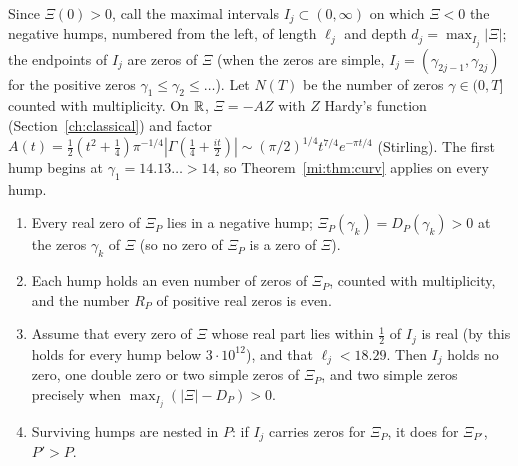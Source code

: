 Since $\Xi(0)>0$, call the maximal intervals $I_j\subset(0,\infty)$ on which $\Xi<0$ the negative humps, numbered from the left, of length $\ell_j$ and depth $d_j=\max_{I_j}|\Xi|$; the endpoints of $I_j$ are zeros of $\Xi$ (when the zeros are simple, $I_j=(\gamma_{2j-1},\gamma_{2j})$ for the positive zeros $\gamma_1\le\gamma_2\le\dots$). Let $N(T)$ be the number of zeros $\gamma\in(0,T]$ counted with multiplicity. On $\mathbb{R}$, $\Xi=-AZ$ with $Z$ Hardy's function (Section~\ref{ch:classical}) and factor $A(t)=\tfrac12(t^2+\tfrac14)\pi^{-1/4}|\Gamma(\tfrac14+\tfrac{it}2)|\sim(\pi/2)^{1/4}t^{7/4}e^{-\pi t/4}$ (Stirling). The first hump begins at $\gamma_1=14.13\ldots>14$, so Theorem~\ref{mi:thm:curv} applies on every hump.

\begin{theorem}\label{mi:thm:humps}
\leavevmode
\begin{enumerate}
\item[(1)] Every real zero of $\Xi_P$ lies in a negative hump; $\Xi_P(\gamma_k)=D_P(\gamma_k)>0$ at the zeros $\gamma_k$ of $\Xi$ (so no zero of $\Xi_P$ is a zero of $\Xi$).
\item[(2)] Each hump holds an even number of zeros of $\Xi_P$, counted with multiplicity, and the number $R_P$ of positive real zeros is even.
\item[(3)] Assume that every zero of $\Xi$ whose real part lies within $\tfrac12$ of $I_j$ is real (by \cite{PT21} this holds for every hump below $3\cdot10^{12}$), and that $\ell_j<18.29$. Then $I_j$ holds no zero, one double zero or two simple zeros of $\Xi_P$, and two simple zeros precisely when $\max_{I_j}(|\Xi|-D_P)>0$.
\item[(4)] Surviving humps are nested in $P$: if $I_j$ carries zeros for $\Xi_P$, it does for $\Xi_{P'}$, $P'>P$.
\end{enumerate}
\end{theorem}

